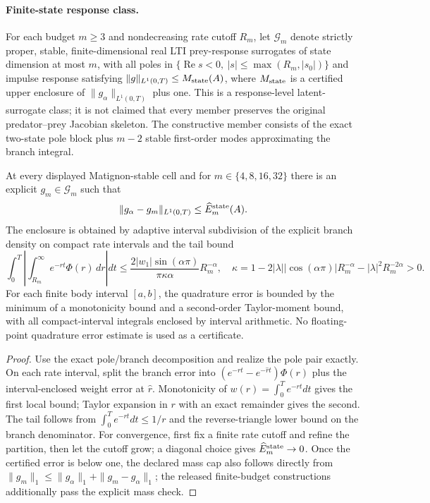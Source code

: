 \paragraph{Finite-state response class.}
For each budget $m\ge3$ and nondecreasing rate cutoff $R_m$, let $\mathcal G_m$ denote strictly proper, stable, finite-dimensional real LTI prey-response surrogates of state dimension at most $m$, with all poles in $\{\operatorname{Re}s<0,\ |s|\le\max(R_m,|s_0|)\}$ and impulse response satisfying $\|g\|_{L^1(0,T)}\le M_{\rm state}(A)$, where $M_{\rm state}$ is a certified upper enclosure of $\|g_\alpha\|_{L^1(0,T)}$ plus one. This is a response-level latent-surrogate class; it is not claimed that every member preserves the original predator--prey Jacobian skeleton. The constructive member consists of the exact two-state pole block plus $m-2$ stable first-order modes approximating the branch integral.

\begin{theorem}
\label{thm:T23}
At every displayed Matignon-stable cell and for $m\in\{4,8,16,32\}$ there is an explicit $g_m\in\mathcal G_m$ such that
\[
\|g_\alpha-g_m\|_{L^1(0,T)}\le \widehat E_m^{\rm state}(A).
\]
The enclosure is obtained by adaptive interval subdivision of the explicit branch density on compact rate intervals and the tail bound
\[
\int_0^T\left|\int_{R_m}^\infty e^{-rt}\Phi(r)\,dr\right|dt
\le\frac{2|w_1|\sin(\alpha\pi)}{\pi\kappa\alpha}R_m^{-\alpha},
\quad
\kappa=1-2|\lambda||\cos(\alpha\pi)|R_m^{-\alpha}-|\lambda|^2R_m^{-2\alpha}>0.
\]
For each finite body interval $[a,b]$, the quadrature error is bounded by the minimum of a monotonicity bound and a second-order Taylor-moment bound, with all compact-interval integrals enclosed by interval arithmetic. No floating-point quadrature error estimate is used as a certificate.
\end{theorem}
\begin{proof}
Use the exact pole/branch decomposition and realize the pole pair exactly. On each rate interval, split the branch error into $(e^{-rt}-e^{-\hat rt})\Phi(r)$ plus the interval-enclosed weight error at $\hat r$. Monotonicity of $w(r)=\int_0^T e^{-rt}dt$ gives the first local bound; Taylor expansion in $r$ with an exact remainder gives the second. The tail follows from $\int_0^T e^{-rt}dt\le1/r$ and the reverse-triangle lower bound on the branch denominator. For convergence, first fix a finite rate cutoff and refine the partition, then let the cutoff grow; a diagonal choice gives $\widehat E_m^{\rm state}\to0$. Once the certified error is below one, the declared mass cap also follows directly from $\|g_m\|_1\le\|g_\alpha\|_1+\|g_m-g_\alpha\|_1$; the released finite-budget constructions additionally pass the explicit mass check.
\end{proof}

